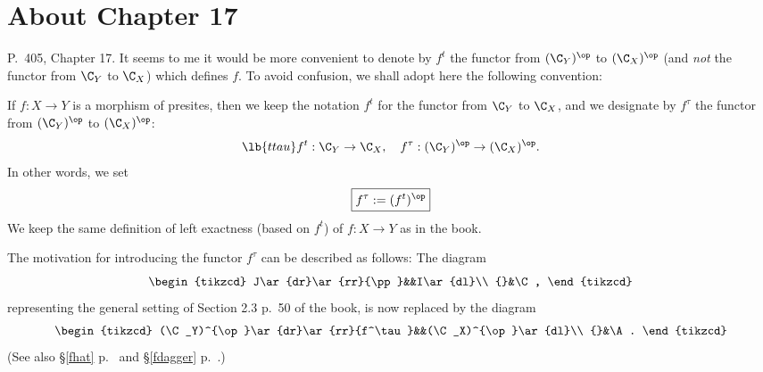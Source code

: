 \documentclass[12pt]{article}
\theoremstyle{remark}
\theoremstyle{definition}
\begin{document}

\section{About Chapter 17}


\begin{s}
P.~405, Chapter 17. It seems to me it would be more convenient to denote by $f^t$ the functor from $(\C_Y)^{\op}$ to $(\C_X)^{\op}$ (and {\em not} the functor from $\C_Y$ to $\C_X$) which defines $f$. To avoid confusion, we shall adopt here the following convention:

If $f:X\to Y$ is a morphism of presites,  then we keep the notation $f^t$ for the functor from $\C_Y$ to $\C_X$, and we designate by $f^\tau$  the functor from $(\C_Y)^{\op}$ to $(\C_X)^{\op}$:
\begin{equation}\lb{ttau}
f^t:\C_Y\to\C_X,\quad f^\tau:(\C_Y)^{\op}\to(\C_X)^{\op}.
\end{equation}
In other words, we set 
$$
\boxed{f^\tau:=(f^t)^{\op}}
$$ 
We keep the same definition of left exactness (based on $f^t$) of $f:X\to Y$ as in the book.

The motivation for introducing the functor $f^\tau$ can be described as follows: The diagram 
$$
\begin{tikzcd}
J\ar{dr}\ar{rr}{\pp}&&I\ar{dl}\\ 
{}&\C,
\end{tikzcd}
$$ 
representing the general setting of Section 2.3 p.~50 of the book, is now replaced by the diagram 
$$
\begin{tikzcd}
(\C_Y)^{\op}\ar{dr}\ar{rr}{f^\tau}&&(\C_X)^{\op}\ar{dl}\\ 
{}&\A.
\end{tikzcd}
$$ 
(See also \S\ref{fhat} p.~ and \S\ref{fdagger} p.~.)
\end{s}

%
\end{document}
